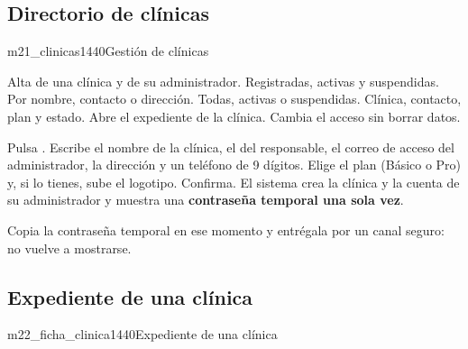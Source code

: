 \documentclass[11pt]{article}
\begin{document}
\needspace{0.55\textheight}
\subsection{Directorio de clínicas}

\begin{pantalla}{m21_clinicas}{1440}{Gestión de clínicas}
\end{pantalla}

\begin{leyenda}
   Alta de una clínica y de su administrador.
   Registradas, activas y suspendidas.
   Por nombre, contacto o dirección.
   Todas, activas o suspendidas.
   Clínica, contacto, plan y estado.
   Abre el expediente de la clínica.
   Cambia el acceso sin borrar datos.
\end{leyenda}

\begin{pasos}
  \paso Pulsa  .
  \paso Escribe el nombre de la clínica, el del responsable, el correo de acceso del administrador, la dirección y un teléfono de 9 dígitos.
  \paso Elige el plan (Básico o Pro) y, si lo tienes, sube el logotipo.
  \paso Confirma. El sistema crea la clínica y la cuenta de su administrador y muestra una \textbf{contraseña temporal una sola vez}.
\end{pasos}

\begin{sdaviso}
Copia la contraseña temporal en ese momento y entrégala por un canal seguro: no vuelve a mostrarse.
\end{sdaviso}

\needspace{0.55\textheight}
\subsection{Expediente de una clínica}

\begin{pantalla}{m22_ficha_clinica}{1440}{Expediente de una clínica}
\end{pantalla}
\end{document}
